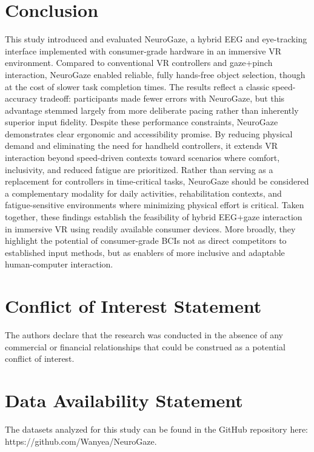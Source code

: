 \documentclass[utf8]{FrontiersinHarvard} %
\begin{document}
\section{Conclusion}
This study introduced and evaluated NeuroGaze, a hybrid EEG and eye-tracking interface implemented with consumer-grade hardware in an immersive VR environment. Compared to conventional VR controllers and gaze+pinch interaction, NeuroGaze enabled reliable, fully hands-free object selection, though at the cost of slower task completion times. The results reflect a classic speed-accuracy tradeoff: participants made fewer errors with NeuroGaze, but this advantage stemmed largely from more deliberate pacing rather than inherently superior input fidelity.
Despite these performance constraints, NeuroGaze demonstrates clear ergonomic and accessibility promise. By reducing physical demand and eliminating the need for handheld controllers, it extends VR interaction beyond speed-driven contexts toward scenarios where comfort, inclusivity, and reduced fatigue are prioritized. Rather than serving as a replacement for controllers in time-critical tasks, NeuroGaze should be considered a complementary modality for daily activities, rehabilitation contexts, and fatigue-sensitive environments where minimizing physical effort is critical.
Taken together, these findings establish the feasibility of hybrid EEG+gaze interaction in immersive VR using readily available consumer devices. More broadly, they highlight the potential of consumer-grade BCIs not as direct competitors to established input methods, but as enablers of more inclusive and adaptable human-computer interaction.


\section*{Conflict of Interest Statement}
The authors declare that the research was conducted in the absence of any commercial or financial relationships that could be construed as a potential conflict of interest.


\section*{Data Availability Statement}
The datasets analyzed for this study can be found in the GitHub repository here: https://github.com/Wanyea/NeuroGaze.



\end{document}
